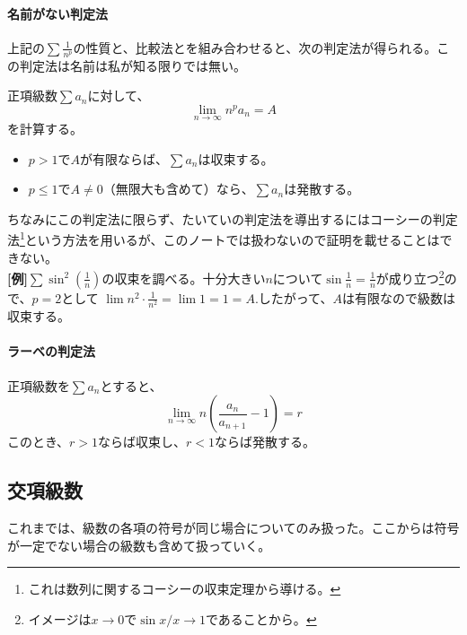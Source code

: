 \documentclass[a4j,dvipdfmx]{jsarticle}
\begin{document}
                \paragraph{名前がない判定法}上記の$\sum \frac{1}{n^p}$の性質と、比較法とを組み合わせると、次の判定法が得られる。この判定法は名前は私が知る限りでは無い。

                正項級数$\sum a_n$に対して、
                \begin{equation}
                    \lim_{n\to\infty}n^p a_n = A \label{eq:名もなき判定法}
                \end{equation}
                を計算する。
                \begin{itemize}
                    \item $p>1$で$A$が有限ならば、$\sum a_n$は収束する。
                    \item $p\leq 1$で$A\neq 0$（無限大も含めて）なら、$\sum a_n$は発散する。
                \end{itemize}
                ちなみにこの判定法に限らず、たいていの判定法を導出するにはコーシーの判定法\footnote{これは数列に関するコーシーの収束定理から導ける。}という方法を用いるが、このノートでは扱わないので証明を載せることはできない。\\

                \textbf{[例]}\hspace{1mm}$\sum \sin^2(\frac{1}{n})$の収束を調べる。十分大きい$n$について$\sin \frac{1}{n} = \frac{1}{n}$が成り立つ\footnote{イメージは$x\to 0$で$\sin x/x\to 1$であることから。}ので、$p=2$として
                $\lim n^2\cdot\frac{1}{n^2}=\lim 1=1=A.$したがって、$A$は有限なので級数は収束する。

                \paragraph{ラーベの判定法}正項級数を$\sum a_n$とすると、
                \begin{equation}
                    \lim_{n\to\infty}n\left(\frac{a_n}{a_{n+1}}-1\right)=r \label{eq:ラーベの判定法}
                \end{equation}
                このとき、$r>1$ならば収束し、$r<1$ならば発散する。
            \clearpage
            \subsection{交項級数}
                これまでは、級数の各項の符号が同じ場合についてのみ扱った。ここからは符号が一定でない場合の級数も含めて扱っていく。
\end{document}

